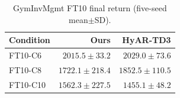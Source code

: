\begin{table}[t]\centering\small\caption{GymInvMgmt FT10 final return (five-seed mean$\pm$SD).}\label{tab:gymret}\begin{tabular}{lrr}\toprule Condition & Ours & HyAR-TD3\\\midrule FT10-C6 & $2015.5\pm33.2$ & $2029.0\pm73.6$\\ FT10-C8 & $1722.1\pm218.4$ & $1852.5\pm110.5$\\ FT10-C10 & $1562.3\pm227.5$ & $1455.1\pm48.2$\\\bottomrule\end{tabular}\end{table}
